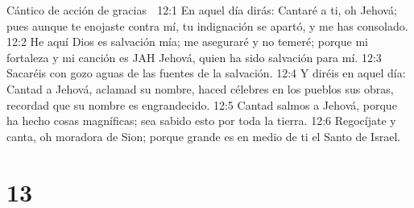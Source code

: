 Cántico de acción de gracias  

12:1 En aquel día dirás: Cantaré a ti, oh Jehová; pues aunque te enojaste contra mí, tu indignación se apartó, y me has consolado.  
12:2 He aquí Dios es salvación mía; me aseguraré y no temeré; porque mi fortaleza y mi canción es JAH Jehová, quien ha sido salvación para mí.  
12:3 Sacaréis con gozo aguas de las fuentes de la salvación.  
12:4 Y diréis en aquel día: Cantad a Jehová, aclamad su nombre, haced célebres en los pueblos sus obras, recordad que su nombre es engrandecido.  
12:5 Cantad salmos a Jehová, porque ha hecho cosas magníficas; sea sabido esto por toda la tierra.  
12:6 Regocíjate y canta, oh moradora de Sion; porque grande es en medio de ti el Santo de Israel.  

\chapter{13}

